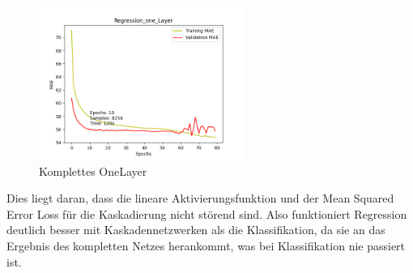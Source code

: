 \begin{figure}[htpb]
    \includegraphics[height=5cm]{../../Plots/ba_plots/regression_large/onelayer_complete.png}
    \caption{\label{fig:largeregr2comp} Komplettes OneLayer}
\end{figure}

Dies liegt daran, dass die lineare Aktivierungsfunktion und der Mean Squared Error Loss für die Kaskadierung nicht störend sind. 
Also funktioniert Regression deutlich besser mit Kaskadennetzwerken als die Klassifikation, da sie an das Ergebnis des kompletten Netzes 
herankommt, was bei Klassifikation nie passiert ist. 
